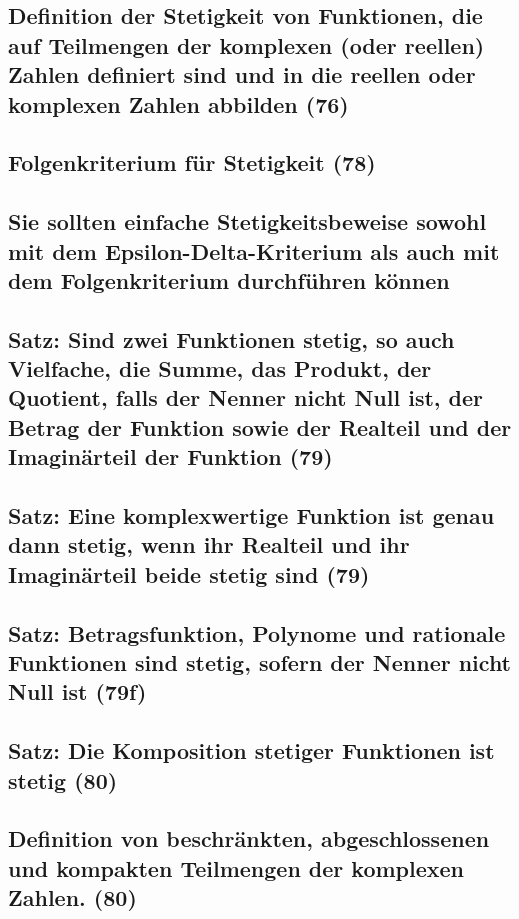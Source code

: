 \subsection{Definition der Stetigkeit von Funktionen, die auf Teilmengen der komplexen (oder reellen) Zahlen definiert sind und in die reellen oder komplexen Zahlen abbilden (76)}

\subsection{Folgenkriterium für Stetigkeit (78)}

\subsection{Sie sollten einfache Stetigkeitsbeweise sowohl mit dem Epsilon-Delta-Kriterium als auch mit dem Folgenkriterium durchführen können}

\subsection{Satz: Sind zwei Funktionen stetig, so auch Vielfache, die Summe, das Produkt, der Quotient, falls der Nenner nicht Null ist, der Betrag der Funktion sowie der Realteil und der Imaginärteil der Funktion (79)}

\subsection{Satz: Eine komplexwertige Funktion ist genau dann stetig, wenn ihr Realteil und ihr Imaginärteil beide stetig sind (79)}

\subsection{Satz: Betragsfunktion, Polynome und rationale Funktionen sind stetig, sofern der Nenner nicht Null ist (79f)}

\subsection{Satz: Die Komposition stetiger Funktionen ist stetig (80)}

\subsection{Definition von beschränkten, abgeschlossenen und kompakten Teilmengen der komplexen Zahlen. (80)}

